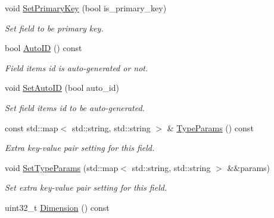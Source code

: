 \begin{DoxyCompactItemize}
\mbox{\label{classmilvus_1_1_field_schema_af564ad9a7a8eadfa0c6348566bd2ad8f}} 
void \hyperlink{classmilvus_1_1_field_schema_af564ad9a7a8eadfa0c6348566bd2ad8f}{Set\+Primary\+Key} (bool is\+\_\+primary\+\_\+key)
\begin{DoxyCompactList}\small\item\em Set field to be primary key. \end{DoxyCompactList}\item 
bool \hyperlink{classmilvus_1_1_field_schema_ae18e54e3d2c90e10a1abdd7426743e75}{Auto\+ID} () const
\begin{DoxyCompactList}\small\item\em Field item\textquotesingle{}s id is auto-\/generated or not. \end{DoxyCompactList}\item 
\mbox{\label{classmilvus_1_1_field_schema_abf644dc4321561c41781bd115e019009}} 
void \hyperlink{classmilvus_1_1_field_schema_abf644dc4321561c41781bd115e019009}{Set\+Auto\+ID} (bool auto\+\_\+id)
\begin{DoxyCompactList}\small\item\em Set field item\textquotesingle{}s id to be auto-\/generated. \end{DoxyCompactList}\item 
const std\+::map$<$ std\+::string, std\+::string $>$ \& \hyperlink{classmilvus_1_1_field_schema_aabcec133858a09803bed5647a2cb2421}{Type\+Params} () const
\begin{DoxyCompactList}\small\item\em Extra key-\/value pair setting for this field. \end{DoxyCompactList}\item 
void \hyperlink{classmilvus_1_1_field_schema_a2e85d1229a2a1a84f9771bab95d4b471}{Set\+Type\+Params} (std\+::map$<$ std\+::string, std\+::string $>$ \&\&params)
\begin{DoxyCompactList}\small\item\em Set extra key-\/value pair setting for this field. \end{DoxyCompactList}\item 
\mbox{\label{classmilvus_1_1_field_schema_afe4cfe65bb0b33f2ad0996b1e540af45}} 
uint32\+\_\+t \hyperlink{classmilvus_1_1_field_schema_afe4cfe65bb0b33f2ad0996b1e540af45}{Dimension} () const

\end{DoxyCompactItemize}
